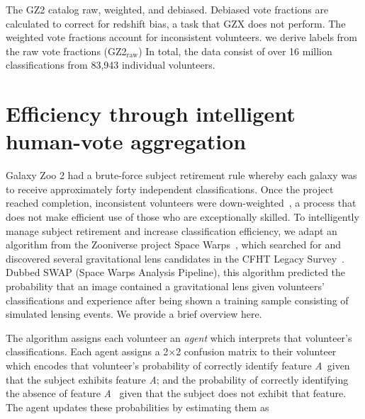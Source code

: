\documentclass[twocolumn, trackchanges, linenumbers]{aastex6}%
\newcommand{\A}{\textit{A}}
\newcommand{\N}{\textit{N}}
\newcommand{\raw}{GZ2$_{\text{raw}}$}
\begin{document}
The GZ2 catalog  raw, weighted, and debiased. Debiased vote fractions are calculated to correct for redshift bias, a task that GZX does not perform. The weighted vote fractions account for inconsistent volunteers.  we derive labels from the raw vote fractions (\raw)  In total, the data consist of over 16 million classifications from 83,943 individual volunteers. 


\section{Efficiency through intelligent human-vote aggregation}\label{sec: SWAP}

Galaxy Zoo 2 had a brute-force subject retirement rule whereby each galaxy was to 
receive approximately forty independent classifications.  Once the project reached 
completion, inconsistent volunteers were down-weighted~\citep{Willett2013}, 
a process that does not make efficient use of those who are exceptionally skilled. 
To intelligently manage subject retirement and increase classification efficiency, 
we adapt an algorithm from the Zooniverse  project Space Warps~\citep{Marshall2016}, 
which searched for and discovered several gravitational lens candidates in the 
CFHT Legacy Survey~\citep{More2016}.  Dubbed SWAP (Space Warps Analysis Pipeline), 
 this algorithm predicted the probability that an image contained a gravitational lens 
given volunteers' classifications and experience after being shown a training sample 
consisting of simulated lensing events.  We provide a brief overview here.  

The algorithm assigns each volunteer an \textit{agent} which interprets that 
volunteer's classifications. Each agent assigns a 2$\times$2 confusion matrix 
to their volunteer which encodes that volunteer's probability of correctly 
identify feature \A~given that the subject  exhibits feature \A; 
and the probability of correctly identifying the absence of feature 
\A~\added{(denoted \N)} given that the subject does not exhibit that feature. 
The agent updates these probabilities by estimating them as 
\end{document}
